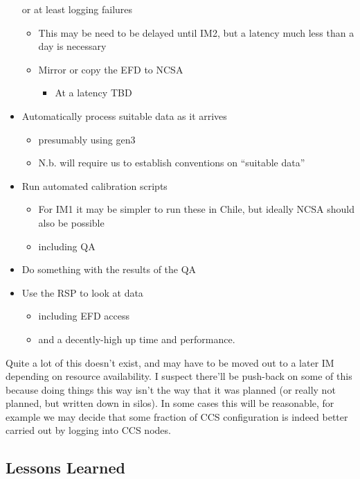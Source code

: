 \begin{itemize}
  or at least logging failures
  \begin{itemize}
  \item This may be need to be delayed until IM2, but a latency much less than a day is
    necessary
  \end{itemize}
  \begin{itemize}
  \item Mirror or copy the EFD to NCSA
    \begin{itemize}
    \item At a latency TBD
    \end{itemize}
  \end{itemize}
\item Automatically process suitable data as it arrives
  \begin{itemize}
  \item presumably using gen3
  \item N.b. will require us to establish conventions on ``suitable data''
  \end{itemize}
\item Run automated calibration scripts
  \begin{itemize}
  \item For IM1 it may be simpler to run these in Chile, but ideally NCSA should also be possible
  \item including QA
  \end{itemize}
\item Do something with the results of the QA
\item Use the RSP to look at data
  \begin{itemize}
  \item including EFD access
  \item and a decently-high up time and performance.
  \end{itemize}
\end{itemize}


Quite a lot of this doesn't exist, and may have to be moved out to a later IM depending on resource
availability.  I suspect there'll be push-back on some of this because doing things this way isn't the way
that it was planned (or really not planned, but written down in silos).  In some cases this will be
reasonable, for example we may decide that some fraction of CCS configuration is indeed better carried out by
logging into CCS nodes.

\subsection{Lessons Learned}
